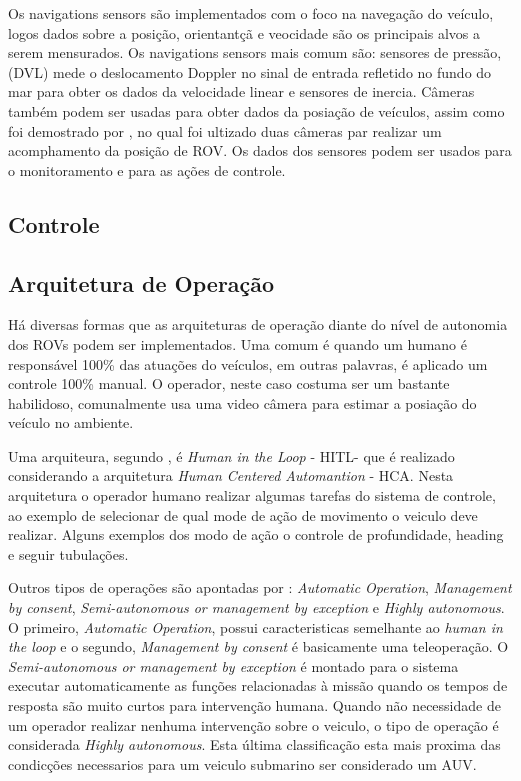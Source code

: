 Os navigations sensors são implementados com o foco na navegação do veículo, logos dados sobre a posição, orientantçã e veocidade são os principais alvos a serem mensurados. Os navigations sensors mais comum são: sensores de pressão, (DVL) mede o deslocamento Doppler no sinal de entrada refletido no fundo do mar para obter os dados da velocidade linear e sensores de inercia. 
Câmeras também podem ser usadas para obter dados da posiação de veículos, assim como foi demostrado por \cite{visual_serving}, no qual foi ultizado duas câmeras par realizar um acomphamento da posição de ROV. Os dados dos sensores podem ser usados para o monitoramento e para as ações de controle.




\subsection{Controle}
\subsection{Arquitetura de Operação}
Há diversas formas que as arquiteturas de operação diante do nível de autonomia dos ROVs podem ser implementados. Uma comum é quando um humano é responsável 100\% das atuações do veículos, em outras palavras, é aplicado um controle 100\% manual. O operador, neste caso costuma ser um bastante habilidoso, comunalmente usa uma video câmera para estimar a posiação do veículo no ambiente.


Uma arquiteura, segundo \cite{wireless_joy}, é \textit{Human in the Loop} - HITL- que é realizado considerando a arquitetura \textit{Human Centered Automantion} - HCA. Nesta arquitetura o operador humano realizar algumas tarefas do sistema de controle, ao exemplo de selecionar de qual mode de ação de movimento o veiculo deve realizar. Alguns exemplos dos modo de ação o controle de profundidade, heading e seguir tubulações.

Outros tipos de operações são apontadas por \cite{Towards}: \textit{Automatic Operation}, \textit{Management by consent}, \textit{Semi-autonomous or management by exception} e \textit{Highly autonomous}. O primeiro, \textit{Automatic Operation}, possui caracteristicas semelhante ao \textit{human in the loop} e o segundo, \textit{Management by consent} é basicamente uma teleoperação. O \textit{Semi-autonomous or management by exception} é montado para o sistema executar automaticamente as funções relacionadas à missão quando os tempos de resposta são muito curtos para intervenção humana.  Quando não necessidade de um operador realizar nenhuma intervenção sobre o veiculo, o tipo de operação é considerada \textit{Highly autonomous}. Esta última classificação esta mais proxima das condicções necessarios para um veiculo submarino ser considerado um AUV.





